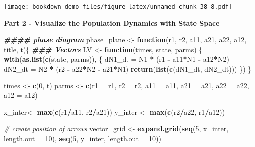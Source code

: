 \documentclass[
]{book}
\newenvironment{Shaded}{\begin{snugshade}}{\end{snugshade}}
\newcommand{\AttributeTok}[1]{\textcolor[rgb]{0.13,0.29,0.53}{#1}}
\newcommand{\CommentTok}[1]{\textcolor[rgb]{0.56,0.35,0.01}{\textit{#1}}}
\newcommand{\ControlFlowTok}[1]{\textcolor[rgb]{0.13,0.29,0.53}{\textbf{#1}}}
\newcommand{\DecValTok}[1]{\textcolor[rgb]{0.00,0.00,0.81}{#1}}
\newcommand{\DocumentationTok}[1]{\textcolor[rgb]{0.56,0.35,0.01}{\textbf{\textit{#1}}}}
\newcommand{\FunctionTok}[1]{\textcolor[rgb]{0.13,0.29,0.53}{\textbf{#1}}}
\newcommand{\NormalTok}[1]{#1}
\newcommand{\OtherTok}[1]{\textcolor[rgb]{0.56,0.35,0.01}{#1}}
\newcommand{\SpecialCharTok}[1]{\textcolor[rgb]{0.81,0.36,0.00}{\textbf{#1}}}
\begin{document}
\texttt{[image: bookdown-demo\_files/figure-latex/unnamed-chunk-38-8.pdf]}

\textbf{Part 2 - Visualize the Population Dynamics with State Space}

\begin{Shaded}
\begin{Highlighting}[]
\DocumentationTok{\#\#\#\# phase diagram}
\NormalTok{phase\_plane }\OtherTok{\textless{}{-}} \ControlFlowTok{function}\NormalTok{(r1, r2, a11, a21, a22, a12, title, t)\{}
    \DocumentationTok{\#\#\# Vectors}
\NormalTok{  LV }\OtherTok{\textless{}{-}} \ControlFlowTok{function}\NormalTok{(times, state, parms) \{}
    \FunctionTok{with}\NormalTok{(}\FunctionTok{as.list}\NormalTok{(}\FunctionTok{c}\NormalTok{(state, parms)), \{}
\NormalTok{      dN1\_dt }\OtherTok{=}\NormalTok{ N1 }\SpecialCharTok{*}\NormalTok{ (r1 }\SpecialCharTok{{-}}\NormalTok{ a11}\SpecialCharTok{*}\NormalTok{N1 }\SpecialCharTok{{-}}\NormalTok{ a12}\SpecialCharTok{*}\NormalTok{N2)}
\NormalTok{      dN2\_dt }\OtherTok{=}\NormalTok{ N2 }\SpecialCharTok{*}\NormalTok{ (r2 }\SpecialCharTok{{-}}\NormalTok{ a22}\SpecialCharTok{*}\NormalTok{N2 }\SpecialCharTok{{-}}\NormalTok{ a21}\SpecialCharTok{*}\NormalTok{N1)}
      \FunctionTok{return}\NormalTok{(}\FunctionTok{list}\NormalTok{(}\FunctionTok{c}\NormalTok{(dN1\_dt, dN2\_dt)))}
\NormalTok{    \})}
\NormalTok{  \}}

\NormalTok{  times }\OtherTok{\textless{}{-}} \FunctionTok{c}\NormalTok{(}\DecValTok{0}\NormalTok{, t)}
\NormalTok{  parms }\OtherTok{\textless{}{-}} \FunctionTok{c}\NormalTok{(}\AttributeTok{r1 =}\NormalTok{ r1, }\AttributeTok{r2 =}\NormalTok{ r2, }\AttributeTok{a11 =}\NormalTok{ a11, }\AttributeTok{a21 =}\NormalTok{ a21, }\AttributeTok{a22 =}\NormalTok{ a22, }\AttributeTok{a12 =}\NormalTok{ a12)}

\NormalTok{  x\_inter}\OtherTok{\textless{}{-}} \FunctionTok{max}\NormalTok{(}\FunctionTok{c}\NormalTok{(r1}\SpecialCharTok{/}\NormalTok{a11, r2}\SpecialCharTok{/}\NormalTok{a21))}
\NormalTok{  y\_inter }\OtherTok{\textless{}{-}} \FunctionTok{max}\NormalTok{(}\FunctionTok{c}\NormalTok{(r2}\SpecialCharTok{/}\NormalTok{a22, r1}\SpecialCharTok{/}\NormalTok{a12))}

  \CommentTok{\# create position of arrows}
\NormalTok{  vector\_grid }\OtherTok{\textless{}{-}} \FunctionTok{expand.grid}\NormalTok{(}\FunctionTok{seq}\NormalTok{(}\DecValTok{5}\NormalTok{, x\_inter, }\AttributeTok{length.out =} \DecValTok{10}\NormalTok{),}
                             \FunctionTok{seq}\NormalTok{(}\DecValTok{5}\NormalTok{, y\_inter, }\AttributeTok{length.out =} \DecValTok{10}\NormalTok{))}


\end{Highlighting}
\end{Shaded}
\end{document}
